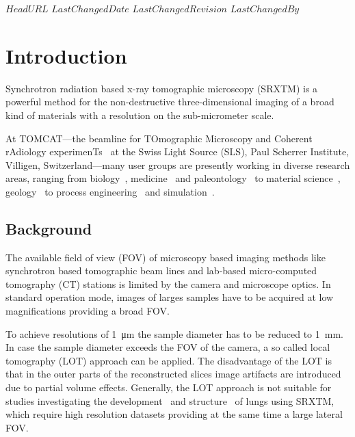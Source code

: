 \svnidlong
{$HeadURL$}
{$LastChangedDate$}
{$LastChangedRevision$}
{$LastChangedBy$}

\ifhtml
\else
\begin{center}
\end{center}
\fi

\section{Introduction}%
Synchrotron radiation based x-ray tomographic microscopy (SRXTM) is a powerful method for the non-destructive three-dimensional imaging of a broad kind of materials with a resolution on the sub-micrometer scale.

At TOMCAT---the beamline for TOmographic Microscopy and Coherent rAdiology experimenTs~\cite{Stampanoni2007} at the Swiss Light Source (SLS), Paul Scherrer Institute, Villigen, Switzerland---many user groups are presently working in diverse research areas, ranging from biology~\cite{McDonald2009,PerezHuerta2009}, medicine~\cite{Schittny2008,Heinzer2008} and paleontology~\cite{Gostling2008,Friis2007,Hagadorn2006,Donoghue2006} to material science~\cite{Gallucci2007}, geology~\cite{Carminati2007} to process engineering~\cite{Davenport2007,Vaucher2007} and simulation~\cite{Tsuda2008}.%

\subsection{Background}%
The available field of view (FOV) of microscopy based imaging methods like synchrotron based tomographic beam lines and lab-based micro-computed tomography (\micro CT) stations is limited by the camera and microscope optics. In standard operation mode, images of larges samples have to be acquired at low magnifications providing a broad FOV.

To achieve resolutions of \SI{1}{\micro\meter} the sample diameter has to be reduced to \SI{1}{\milli\meter}. In case the sample diameter exceeds the FOV of the camera, a so called local tomography (LOT) approach can be applied. The disadvantage of the LOT is that in the outer parts of the reconstructed slices image artifacts are introduced due to partial volume effects. Generally, the LOT approach is not suitable for studies investigating the development~\cite{Schittny2008,Mund2008} and structure~\cite{Tsuda2008} of lungs using SRXTM, which require high resolution datasets providing at the same time a large lateral FOV.

